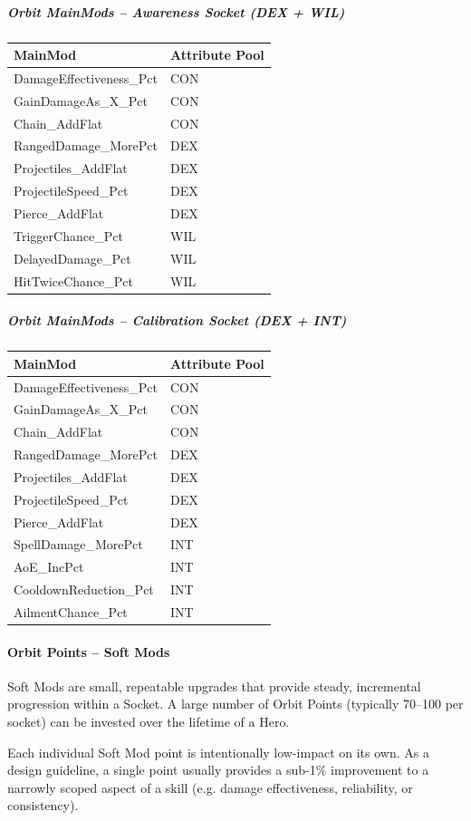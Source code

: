\subparagraph{Orbit MainMods -- Awareness Socket (DEX + WIL)}
\begin{tabular}{l|l}
	\textbf{MainMod} & \textbf{Attribute Pool} \\ \hline
	DamageEffectiveness\_Pct & CON \\
	GainDamageAs\_X\_Pct & CON \\
	Chain\_AddFlat & CON \\
	RangedDamage\_MorePct & DEX \\
	Projectiles\_AddFlat & DEX \\
	ProjectileSpeed\_Pct & DEX \\
	Pierce\_AddFlat & DEX \\
	TriggerChance\_Pct & WIL \\
	DelayedDamage\_Pct & WIL \\
	HitTwiceChance\_Pct & WIL \\
\end{tabular}

\subparagraph{Orbit MainMods -- Calibration Socket (DEX + INT)}
\begin{tabular}{l|l}
	\textbf{MainMod} & \textbf{Attribute Pool} \\ \hline
	DamageEffectiveness\_Pct & CON \\
	GainDamageAs\_X\_Pct & CON \\
	Chain\_AddFlat & CON \\
	RangedDamage\_MorePct & DEX \\
	Projectiles\_AddFlat & DEX \\
	ProjectileSpeed\_Pct & DEX \\
	Pierce\_AddFlat & DEX \\
	SpellDamage\_MorePct & INT \\
	AoE\_IncPct & INT \\
	CooldownReduction\_Pct & INT \\
	AilmentChance\_Pct & INT \\
\end{tabular}

\paragraph{Orbit Points – Soft Mods}

Soft Mods are small, repeatable upgrades that provide steady, incremental progression within a Socket. 
A large number of Orbit Points (typically 70–100 per socket) can be invested over the lifetime of a Hero.

Each individual Soft Mod point is intentionally low-impact on its own. 
As a design guideline, a single point usually provides a sub-1\% improvement to a narrowly scoped aspect of a skill (e.g. damage effectiveness, reliability, or consistency).

